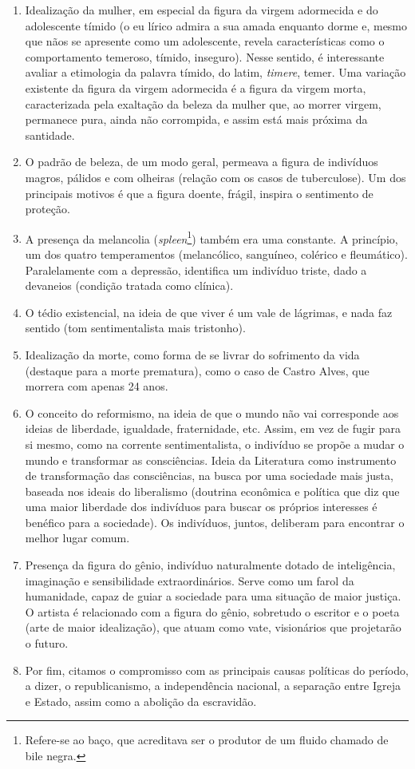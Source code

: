 \documentclass[12pt]{book}
\begin{document}
		\begin{enumerate}
			\item Idealização da mulher, em especial da figura da virgem adormecida e do adolescente tímido (o eu lírico admira a sua amada enquanto dorme e, mesmo que nãos se apresente como um adolescente, revela características como o comportamento temeroso, tímido, inseguro). Nesse sentido, é interessante avaliar a etimologia da palavra tímido, do latim, \textit{timere}, temer. Uma variação existente da figura da virgem adormecida é a figura da virgem morta, caracterizada pela exaltação da beleza da mulher que, ao morrer virgem, permanece pura, ainda não corrompida, e assim está mais próxima da santidade.
			\item O padrão de beleza, de um modo geral, permeava a figura de indivíduos magros,  pálidos e com olheiras (relação com os casos de tuberculose). Um dos principais motivos é que a figura doente, frágil, inspira o sentimento de proteção.
			\item A presença da melancolia (\textit{spleen}\footnote{Refere-se ao baço, que acreditava ser o produtor de um fluido chamado de bile negra.}) também era uma constante. A princípio, um dos quatro temperamentos (melancólico, sanguíneo, colérico e fleumático). Paralelamente com a depressão, identifica um indivíduo triste, dado a devaneios (condição tratada como clínica).
			\item O tédio existencial, na ideia de que viver é um vale de lágrimas, e nada faz sentido (tom sentimentalista mais tristonho).
			\item Idealização da morte, como forma de se livrar do sofrimento da vida (destaque para a morte prematura), como o caso de Castro Alves, que morrera com apenas 24 anos.
			\item O conceito do reformismo, na ideia de que o mundo não vai corresponde aos ideias de liberdade, igualdade, fraternidade, etc. Assim, em vez de fugir para si mesmo, como na corrente sentimentalista, o indivíduo se propõe a mudar o mundo e transformar as consciências. Ideia da Literatura como instrumento de transformação das consciências, na busca por uma sociedade mais justa, baseada nos ideais do liberalismo (doutrina econômica e política que diz que uma maior liberdade dos indivíduos para buscar os próprios interesses é benéfico para a sociedade). Os indivíduos, juntos, deliberam para encontrar o melhor lugar comum.
			\item Presença da figura do gênio, indivíduo naturalmente dotado de inteligência, imaginação e sensibilidade extraordinários. Serve como um farol da humanidade, capaz de guiar a sociedade para uma situação de maior justiça. O artista é relacionado com a figura do gênio, sobretudo o escritor e o poeta (arte de maior idealização), que atuam como vate, visionários que projetarão o futuro.
			\item Por fim, citamos o compromisso com as principais causas políticas do período, a dizer, o republicanismo, a independência nacional, a separação entre Igreja e Estado, assim como a abolição da escravidão.
		\end{enumerate}
\end{document}

